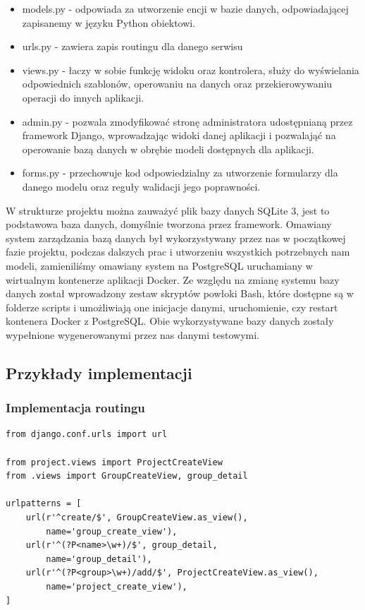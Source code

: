 \documentclass[12pt]{article}
\begin{document}
\begin{itemize}
\item
models.py - odpowiada za utworzenie encji w bazie danych, odpowiadającej zapisanemy w języku Python obiektowi. 
\item
urls.py - zawiera zapis routingu dla danego serwisu
\item
views.py - łaczy w sobie funkcję widoku oraz kontrolera, służy do wyświelania odpowiednich szablonów, operowaniu na danych oraz przekierowywaniu operacji do innych aplikacji.
\item
admin.py - pozwala zmodyfikować stronę administratora udostępnianą przez framework Django, wprowadzając widoki danej aplikacji i pozwalająć na operowanie bazą danych w obrębie modeli dostępnych dla aplikacji.  
\item
forms.py - przechowuje kod odpowiedzialny za utworzenie formularzy dla danego modelu oraz reguły walidacji jego poprawności.

\end{itemize}

W strukturze projektu można zauważyć plik bazy danych SQLite 3, jest to podstawowa baza danych, domyślnie tworzona przez framework. Omawiany system zarządzania bazą danych był wykorzystywany przez nas w początkowej fazie projektu, podczas dalszych prac i utworzeniu wszystkich potrzebnych nam modeli, zamieniliśmy omawiany system na PostgreSQL uruchamiany w wirtualnym kontenerze aplikacji Docker. Ze względu na zmianę systemu bazy danych został wprowadzony zestaw skryptów powłoki Bash, które dostępne są w folderze scripts  i umożliwiają one inicjacje danymi, uruchomienie, czy restart kontenera Docker z PostgreSQL. Obie wykorzystywane bazy danych zostały wypełnione wygenerowanymi przez nas danymi testowymi. 

\subsection{Przykłady implementacji}

\subsubsection{Implementacja routingu}

\begin{lstlisting}[caption={groups/urls.py}]
from django.conf.urls import url

from project.views import ProjectCreateView
from .views import GroupCreateView, group_detail

urlpatterns = [
    url(r'^create/$', GroupCreateView.as_view(),
        name='group_create_view'),
    url(r'^(?P<name>\w+)/$', group_detail,
        name='group_detail'),
    url(r'^(?P<group>\w+)/add/$', ProjectCreateView.as_view(),
        name='project_create_view'),
]
\end{lstlisting}
\end{document}
